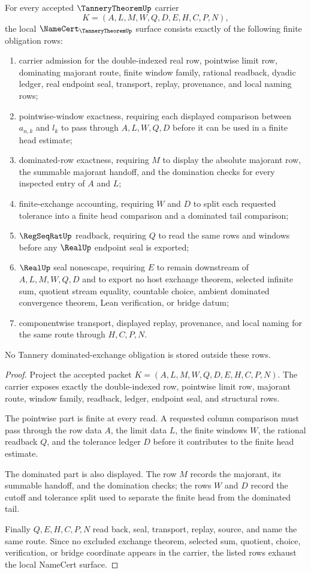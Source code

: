 \begin{theorem}
\label{thm:tannery-theorem-namecert-obligations}
For every accepted $\TanneryTheoremUp$ carrier
$$
K=(A,L,M,W,Q,D,E,H,C,P,N),
$$
the local $\NameCert_{\TanneryTheoremUp}$ surface consists exactly of the following finite obligation rows:
\begin{enumerate}
\item carrier admission for the double-indexed real row, pointwise limit row, dominating majorant route, finite window family, rational readback, dyadic ledger, real endpoint seal, transport, replay, provenance, and local naming rows;
\item pointwise-window exactness, requiring each displayed comparison between $a_{n,k}$ and $l_k$ to pass through $A,L,W,Q,D$ before it can be used in a finite head estimate;
\item dominated-row exactness, requiring $M$ to display the absolute majorant row, the summable majorant handoff, and the domination checks for every inspected entry of $A$ and $L$;
\item finite-exchange accounting, requiring $W$ and $D$ to split each requested tolerance into a finite head comparison and a dominated tail comparison;
\item $\RegSeqRatUp$ readback, requiring $Q$ to read the same rows and windows before any $\RealUp$ endpoint seal is exported;
\item $\RealUp$ seal nonescape, requiring $E$ to remain downstream of $A,L,M,W,Q,D$ and to export no host exchange theorem, selected infinite sum, quotient stream equality, countable choice, ambient dominated convergence theorem, Lean verification, or bridge datum;
\item componentwise transport, displayed replay, provenance, and local naming for the same route through $H,C,P,N$.
\end{enumerate}
No Tannery dominated-exchange obligation is stored outside these rows.
\end{theorem}
\begin{proof}
Project the accepted packet $K=(A,L,M,W,Q,D,E,H,C,P,N)$. The carrier exposes exactly the double-indexed row, pointwise limit row, majorant route, window family, readback, ledger, endpoint seal, and structural rows.

The pointwise part is finite at every read. A requested column comparison must pass through the row data $A$, the limit data $L$, the finite windows $W$, the rational readback $Q$, and the tolerance ledger $D$ before it contributes to the finite head estimate.

The dominated part is also displayed. The row $M$ records the majorant, its summable handoff, and the domination checks; the rows $W$ and $D$ record the cutoff and tolerance split used to separate the finite head from the dominated tail.

Finally $Q,E,H,C,P,N$ read back, seal, transport, replay, source, and name the same route. Since no excluded exchange theorem, selected sum, quotient, choice, verification, or bridge coordinate appears in the carrier, the listed rows exhaust the local NameCert surface.
\end{proof}
